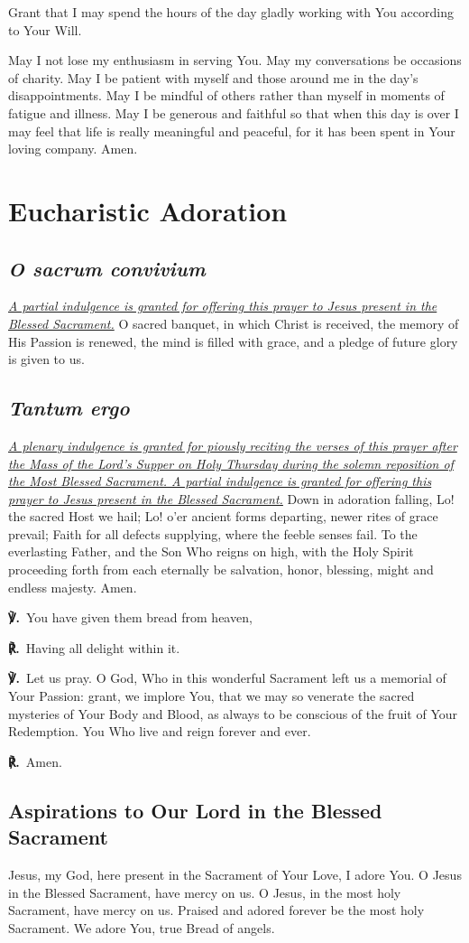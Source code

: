 \documentclass[12pt]{article}
\makeatletter
\newcommand{\prayersection}[1]{\section{#1}}
\newcommand{\prayertitle}[1]{\subsection{#1}}
\newcommand{\indulgencedprayertitle}[1]{\prayertitle{#1 \protect\kreuz}}
\newcommand{\emphasis}[1]{\emph{#1}}
\newcommand{\emphasis}[1]{\textsl{#1}}
\newcommand{\foreign}[1]{\emphasis{#1}}
\newcommand{\note}[1]{{\small{\emphasis{#1}}}\newline}
\newcommand{\linkednote}[2]{\hyperlink{#1}{\note{#2}}}
\newcommand{\versicle}{{\setmainfont{Times New Roman}\textbf{℣.}}\xspace}
\newcommand{\response}{{\setmainfont{Times New Roman}\textbf{℟.}}\xspace}
\DeclareRobustCommand{\versicle}{\textbf{\vers@resp{-0.1em}{V}.}\xspace}
\DeclareRobustCommand{\response}{\textbf{\vers@resp{0pt}{R}.}\xspace}
\newcommand{\vers@resp@sym}{\raisebox{0.2ex}{\rotatebox[origin=c]{-20}{$\m@th\rceil$}}}
\newcommand{\vers@resp}[2]{%
		{\ooalign{\hidewidth\kern#1\vers@resp@sym\hidewidth\cr#2\cr}}%
	}
\makeatother
\begin{document}
Grant that I may spend the hours of the day gladly working with You according to Your Will.

May I not lose my enthusiasm in serving You.
May my conversations be occasions of charity.
May I be patient with myself and those around me in the day's disappointments.
May I be mindful of others rather than myself in moments of fatigue and illness.
May I be generous and faithful so that when this day is over I may feel that life is really meaningful and peaceful, for it has been spent in Your loving company.
Amen.

\newpage

\prayersection{Eucharistic Adoration}
\indulgencedprayertitle{\foreign{O sacrum convivium}}
\linkednote{grant7}{A partial indulgence is granted for offering this prayer to Jesus present in the Blessed Sacrament.}
O sacred banquet, in which Christ is received, the memory of His Passion is renewed, the mind is filled with grace, and a pledge of future glory is given to us.

\indulgencedprayertitle{\foreign{Tantum ergo}}
\linkednote{grant7}{A plenary indulgence is granted for piously reciting the verses of this prayer after the Mass of the Lord's Supper on Holy Thursday during the solemn reposition of the Most Blessed Sacrament.
A partial indulgence is granted for offering this prayer to Jesus present in the Blessed Sacrament.}
Down in adoration falling,
Lo! the sacred Host we hail;
Lo! o'er ancient forms departing,
newer rites of grace prevail;
Faith for all defects supplying,
where the feeble senses fail.
To the everlasting Father,
and the Son Who reigns on high,
with the Holy Spirit proceeding
forth from each eternally
be salvation, honor, blessing,
might and endless majesty.
Amen.

\versicle\ You have given them bread from heaven,

\response\ Having all delight within it.

\versicle\ Let us pray.
O God, Who in this wonderful Sacrament left us a memorial of Your Passion:
grant, we implore You, that we may so venerate the sacred mysteries of Your Body and Blood, as always to be conscious of the fruit of Your Redemption.
You Who live and reign forever and ever.

\response\ Amen.

\prayertitle{Aspirations to Our Lord in the Blessed Sacrament}
Jesus, my God, here present in the Sacrament of Your Love, I adore You. 
O Jesus in the Blessed Sacrament, have mercy on us. 
O Jesus, in the most holy Sacrament, have mercy on us. 
Praised and adored forever be the most holy Sacrament. 
We adore You, true Bread of angels. 
\end{document}

